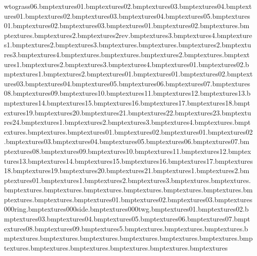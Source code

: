wtograss06.bmp textures\snowtograsscorner01.bmp textures\snowtograsscorner02.bmp textures\snowtograsscorner03.bmp textures\snowtograsscorner04.bmp textures\snowtopath01.bmp textures\snowtopath02.bmp textures\snowtopath03.bmp textures\snowtopath04.bmp textures\snowtopath05.bmp textures\snowtopathcorner01.bmp textures\snowtopathcorner02.bmp textures\snowtopathcorner03.bmp textures\snowtopathdecal01.bmp textures\snowtopathdecal02.bmp textures\strawfloor.bmp textures\tazsign.bmp textures\tazsign2.bmp textures\tazsign2rev.bmp textures\tazsign3.bmp textures\tazsign4.bmp textures\templevines1.bmp textures\templevines2.bmp textures\templevines3.bmp textures\treeend.bmp textures\treeleave.bmp textures\treeleave2.bmp textures\treeleave3.bmp textures\treeleave4.bmp textures\treeplanks.bmp textures\treeropes.bmp textures\treeropes2.bmp textures\treeropesend.bmp textures\treewall1.bmp textures\treewall2.bmp textures\treewall3.bmp textures\treewall4.bmp textures\vines01.bmp textures\vines02.bmp textures\wardensign1.bmp textures\wardensign2.bmp textures\water01.bmp textures\waterfall01.bmp textures\waterfall02.bmp textures\waterfall03.bmp textures\waterfall04.bmp textures\waterfall05.bmp textures\waterfall06.bmp textures\waterfall07.bmp textures\waterfall08.bmp textures\waterfall09.bmp textures\waterfall10.bmp textures\waterfall11.bmp textures\waterfall12.bmp textures\waterfall13.bmp textures\waterfall14.bmp textures\waterfall15.bmp textures\waterfall16.bmp textures\waterfall17.bmp textures\waterfall18.bmp textures\waterfall19.bmp textures\waterfall20.bmp textures\waterfall21.bmp textures\waterfall22.bmp textures\waterfall23.bmp textures\waterfall24.bmp textures\wbridge1.bmp textures\wbridge2.bmp textures\wbridge3.bmp textures\wbridge4.bmp textures\web.bmp textures\window.bmp textures\wires.bmp textures\woodblock01.bmp textures\woodblock02.bmp textures\wpaper01.bmp textures\wpaper02.bmp textures\wpaper03.bmp textures\wpaper04.bmp textures\wpaper05.bmp textures\wpaper06.bmp textures\wpaper07.bmp textures\wpaper08.bmp textures\wpaper09.bmp textures\wpaper10.bmp textures\wpaper11.bmp textures\wpaper12.bmp textures\wpaper13.bmp textures\wpaper14.bmp textures\wpaper15.bmp textures\wpaper16.bmp textures\wpaper17.bmp textures\wpaper18.bmp textures\wpaper19.bmp textures\wpaper20.bmp textures\wpaper21.bmp textures\wpaperfish1.bmp textures\wpaperfish2.bmp textures\zoorails01.bmp textures\zoosign1.bmp textures\zoosign2.bmp textures\zoosign3.bmp textures\plantspikeblue.bmp textures\plantspikegreen.bmp textures\plantspikepurple.bmp textures\plantspikered.bmp textures\plantspikesafari.bmp textures\torch.bmp textures\fblu.bmp textures\fgre.bmp textures\fpurp.bmp textures\fred.bmp textures\gen01.bmp textures\gen02.bmp textures\gen03.bmp textures\1000ring.bmp textures\1000side.bmp textures\1000twg.bmp textures\anvil01.bmp textures\anvil02.bmp textures\anvil03.bmp textures\anvil04.bmp textures\anvil05.bmp textures\anvil06.bmp textures\anvil07.bmp textures\anvil08.bmp textures\anvil09.bmp textures\bow5.bmp textures\cupbfrt.bmp textures\cupstuff.bmp textures\phbkbot.bmp textures\phbktop.bmp textures\phbot.bmp textures\phbxedge.bmp textures\phedge.bmp textures\phfront.bmp textures\phholes.bmp textures\phinbot.bmp textures\phintop.bmp textures\phonebot.bmp textures\phonetop.bmp textures\phrftop.bmp textures\phro